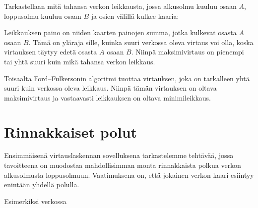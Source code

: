 Tarkastellaan mitä tahansa verkon leikkausta,
jossa alkusolmu kuuluu osaan $A$,
loppusolmu kuuluu osaan $B$ ja osien välillä kulkee kaaria:

\begin{center}
\end{center}

Leikkauksen paino on niiden kaarten painojen summa,
jotka kulkevat osasta $A$ osaan $B$.
Tämä on yläraja sille, kuinka suuri verkossa oleva virtaus voi olla,
koska virtauksen täytyy edetä osasta $A$ osaan $B$.
Niinpä maksimivirtaus on pienempi tai yhtä suuri kuin
mikä tahansa verkon leikkaus.

Toisaalta Ford–Fulkersonin algoritmi tuottaa virtauksen,
joka on tarkalleen yhtä suuri kuin verkossa oleva leikkaus.
Niinpä tämän virtauksen on oltava maksimivirtaus ja
vastaavasti leikkauksen on oltava minimileikkaus.

\section{Rinnakkaiset polut}

Ensimmäisenä virtauslaskennan sovelluksena tarkastelemme
tehtävää, jossa tavoitteena on muodostaa mahdollisimman
monta rinnakkaista polkua verkon alkusolmusta loppusolmuun.
Vaatimuksena on, että jokainen verkon kaari esiintyy
enintään yhdellä polulla.

Esimerkiksi verkossa
\begin{center}
\end{center}

